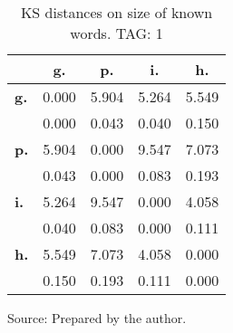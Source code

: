 \begin{table}[h!]
\begin{center}
\caption{KS distances on size of known words. TAG: 1}
\begin{tabular}{| l || c | c | c | c |}\hline
 & {\bf g.} & {\bf p.} & {\bf i.} & {\bf h.} \\\hline\hline
{\bf g.} & 0.000 & 5.904 & 5.264 & 5.549 \\
{\bf } & 0.000 & 0.043 & 0.040 & 0.150 \\\hline
{\bf p.} & 5.904 & 0.000 & 9.547 & 7.073 \\
{\bf } & 0.043 & 0.000 & 0.083 & 0.193 \\\hline
{\bf i.} & 5.264 & 9.547 & 0.000 & 4.058 \\
{\bf } & 0.040 & 0.083 & 0.000 & 0.111 \\\hline
{\bf h.} & 5.549 & 7.073 & 4.058 & 0.000 \\
{\bf } & 0.150 & 0.193 & 0.111 & 0.000 \\\hline
\end{tabular}
\begin{flushleft}
		Source: Prepared by the author.\
\end{flushleft}
\end{center}
\end{table} 
